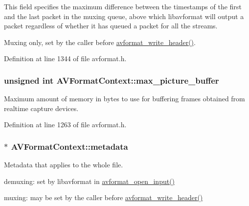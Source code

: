 This field specifies the maximum difference between the timestamps of the first and the last packet in the muxing queue, above which libavformat will output a packet regardless of whether it has queued a packet for all the streams.

Muxing only, set by the caller before \hyperlink{group__lavf__encoding_ga78d4e734fecb1d2385536e6dd5b7b9f5}{avformat\+\_\+write\+\_\+header()}. 

Definition at line 1344 of file avformat.\+h.

\subsubsection[{\texorpdfstring{max\+\_\+picture\+\_\+buffer}{max_picture_buffer}}]{\setlength{\rightskip}{0pt plus 5cm}unsigned {\bf int} A\+V\+Format\+Context\+::max\+\_\+picture\+\_\+buffer}\hypertarget{struct_a_v_format_context_ae188350a3838a14a233bf272d68998be}{}\label{struct_a_v_format_context_ae188350a3838a14a233bf272d68998be}
Maximum amount of memory in bytes to use for buffering frames obtained from realtime capture devices. 

Definition at line 1263 of file avformat.\+h.

\subsubsection[{\texorpdfstring{metadata}{metadata}}]{$\ast$ A\+V\+Format\+Context\+::metadata}\hypertarget{struct_a_v_format_context_a3019a56080ed2e3297ff25bc2ff88adf}{}\label{struct_a_v_format_context_a3019a56080ed2e3297ff25bc2ff88adf}
Metadata that applies to the whole file.


\begin{DoxyItemize}
\item demuxing\+: set by libavformat in \hyperlink{group__lavf__decoding_ga10a404346c646e4ab58f4ed798baca32}{avformat\+\_\+open\+\_\+input()}
\item muxing\+: may be set by the caller before \hyperlink{group__lavf__encoding_ga78d4e734fecb1d2385536e6dd5b7b9f5}{avformat\+\_\+write\+\_\+header()}
\end{DoxyItemize}

